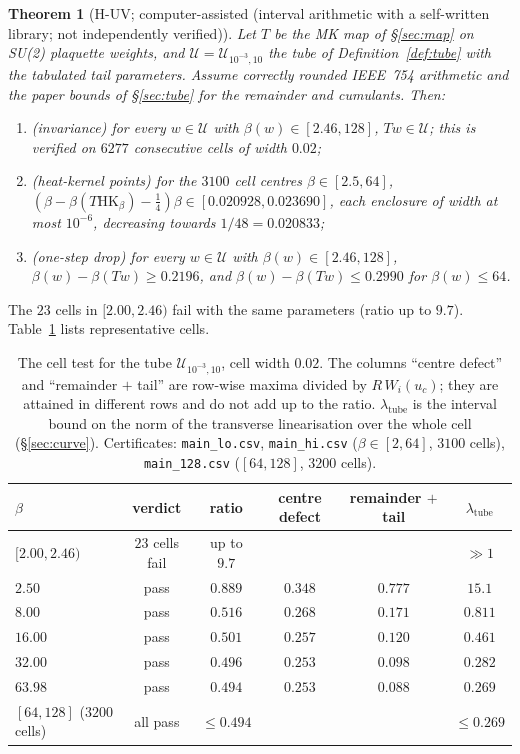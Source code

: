 \documentclass[11pt,a4paper]{article}
\newtheorem{theorem}{Theorem}[section]
\theoremstyle{definition}
\theoremstyle{remark}
\newcommand{\code}[1]{\texttt{#1}}
\newcommand{\HK}{\mathrm{HK}}
\newcommand{\cU}{\mathcal{U}}
\newcommand{\IA}{computer-assisted (interval arithmetic with a self-written library; not independently verified)}
\begin{document}
\begin{theorem}[H-UV; \IA]\label{thm:huv}
Let $T$ be the MK map of \S\ref{sec:map} on SU(2) plaquette weights, and $\cU=\cU_{10^{-3},10}$ the tube of Definition~\ref{def:tube} with the tabulated tail parameters.
Assume correctly rounded IEEE~754 arithmetic and the paper bounds of \S\ref{sec:tube} for the remainder and cumulants.
Then:
\begin{enumerate}[label=(\roman*)]
\item (invariance) for every $w\in\cU$ with $\beta(w)\in[2.46,128]$, $Tw\in\cU$; this is verified on $6277$ consecutive cells of width $0.02$;
\item (heat-kernel points) for the $3100$ cell centres $\beta\in[2.5,64]$, $(\beta-\beta(T\HK_\beta)-\tfrac14)\beta\in[0.020928,0.023690]$, each enclosure of width at most $10^{-6}$, decreasing towards $1/48=0.020833$;
\item (one-step drop) for every $w\in\cU$ with $\beta(w)\in[2.46,128]$, $\beta(w)-\beta(Tw)\ge0.2196$, and $\beta(w)-\beta(Tw)\le0.2990$ for $\beta(w)\le64$.
\end{enumerate}
\end{theorem}
The $23$ cells in $[2.00,2.46)$ fail with the same parameters (ratio up to $9.7$).
Table~\ref{tab:cells} lists representative cells.

\begin{table}[ht]\centering\small
\begin{tabular}{lccccc}
\toprule
$\beta$ & verdict & ratio & centre defect & remainder $+$ tail & $\lambda_{\mathrm{tube}}$ \\
\midrule
$[2.00,2.46)$ & $23$ cells fail & up to $9.7$ & & & $\gg1$ \\
$2.50$ & pass & $0.889$ & $0.348$ & $0.777$ & $15.1$ \\
$8.00$ & pass & $0.516$ & $0.268$ & $0.171$ & $0.811$ \\
$16.00$ & pass & $0.501$ & $0.257$ & $0.120$ & $0.461$ \\
$32.00$ & pass & $0.496$ & $0.253$ & $0.098$ & $0.282$ \\
$63.98$ & pass & $0.494$ & $0.253$ & $0.088$ & $0.269$ \\
$[64,128]$ ($3200$ cells) & all pass & $\le0.494$ & & & $\le0.269$ \\
\bottomrule
\end{tabular}
\caption{The cell test for the tube $\cU_{10^{-3},10}$, cell width $0.02$. The columns ``centre defect'' and ``remainder $+$ tail'' are row-wise maxima divided by $R\,W_i(u_c)$; they are attained in different rows and do not add up to the ratio. $\lambda_{\mathrm{tube}}$ is the interval bound on the norm of the transverse linearisation over the whole cell (\S\ref{sec:curve}). Certificates: \code{main\_lo.csv}, \code{main\_hi.csv} ($\beta\in[2,64]$, $3100$ cells), \code{main\_128.csv} ($[64,128]$, $3200$ cells).}\label{tab:cells}
\end{table}
\end{document}
